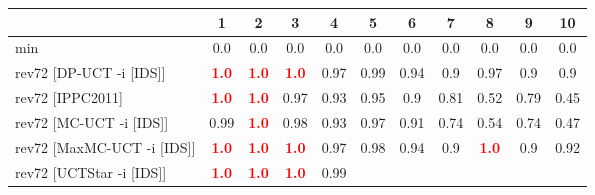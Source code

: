 \documentclass{article}
\begin{document}
\begin{tabular}{|l|r@{$\pm$}rr@{$\pm$}rr@{$\pm$}rr@{$\pm$}rr@{$\pm$}rr@{$\pm$}rr@{$\pm$}rr@{$\pm$}rr@{$\pm$}rr@{$\pm$}r|}
\hline

& \multicolumn{2}{c}{1}
& \multicolumn{2}{c}{2}
& \multicolumn{2}{c}{3}
& \multicolumn{2}{c}{4}
& \multicolumn{2}{c}{5}
& \multicolumn{2}{c}{6}
& \multicolumn{2}{c}{7}
& \multicolumn{2}{c}{8}
& \multicolumn{2}{c}{9}
& \multicolumn{2}{c|}{10}
\\
\hline
\hline
min
& \multicolumn{2}{c}{0.0}
& \multicolumn{2}{c}{0.0}
& \multicolumn{2}{c}{0.0}
& \multicolumn{2}{c}{0.0}
& \multicolumn{2}{c}{0.0}
& \multicolumn{2}{c}{0.0}
& \multicolumn{2}{c}{0.0}
& \multicolumn{2}{c}{0.0}
& \multicolumn{2}{c}{0.0}
& \multicolumn{2}{c|}{0.0}
\\
rev72 [DP-UCT -i [IDS]]
& \multicolumn{2}{c}{\textbf{\textcolor{red}{1.0}}}
& \multicolumn{2}{c}{\textbf{\textcolor{red}{1.0}}}
& \multicolumn{2}{c}{\textbf{\textcolor{red}{1.0}}}
& \multicolumn{2}{c}{0.97}
& \multicolumn{2}{c}{0.99}
& \multicolumn{2}{c}{0.94}
& \multicolumn{2}{c}{0.9}
& \multicolumn{2}{c}{0.97}
& \multicolumn{2}{c}{0.9}
& \multicolumn{2}{c|}{0.9}
\\
rev72 [IPPC2011]
& \multicolumn{2}{c}{\textbf{\textcolor{red}{1.0}}}
& \multicolumn{2}{c}{\textbf{\textcolor{red}{1.0}}}
& \multicolumn{2}{c}{0.97}
& \multicolumn{2}{c}{0.93}
& \multicolumn{2}{c}{0.95}
& \multicolumn{2}{c}{0.9}
& \multicolumn{2}{c}{0.81}
& \multicolumn{2}{c}{0.52}
& \multicolumn{2}{c}{0.79}
& \multicolumn{2}{c|}{0.45}
\\
rev72 [MC-UCT -i [IDS]]
& \multicolumn{2}{c}{0.99}
& \multicolumn{2}{c}{\textbf{\textcolor{red}{1.0}}}
& \multicolumn{2}{c}{0.98}
& \multicolumn{2}{c}{0.93}
& \multicolumn{2}{c}{0.97}
& \multicolumn{2}{c}{0.91}
& \multicolumn{2}{c}{0.74}
& \multicolumn{2}{c}{0.54}
& \multicolumn{2}{c}{0.74}
& \multicolumn{2}{c|}{0.47}
\\
rev72 [MaxMC-UCT -i [IDS]]
& \multicolumn{2}{c}{\textbf{\textcolor{red}{1.0}}}
& \multicolumn{2}{c}{\textbf{\textcolor{red}{1.0}}}
& \multicolumn{2}{c}{\textbf{\textcolor{red}{1.0}}}
& \multicolumn{2}{c}{0.97}
& \multicolumn{2}{c}{0.98}
& \multicolumn{2}{c}{0.94}
& \multicolumn{2}{c}{0.9}
& \multicolumn{2}{c}{\textbf{\textcolor{red}{1.0}}}
& \multicolumn{2}{c}{0.9}
& \multicolumn{2}{c|}{0.92}
\\
rev72 [UCTStar -i [IDS]]
& \multicolumn{2}{c}{\textbf{\textcolor{red}{1.0}}}
& \multicolumn{2}{c}{\textbf{\textcolor{red}{1.0}}}
& \multicolumn{2}{c}{\textbf{\textcolor{red}{1.0}}}
& \multicolumn{2}{c}{0.99}

\end{tabular}
\end{document}
